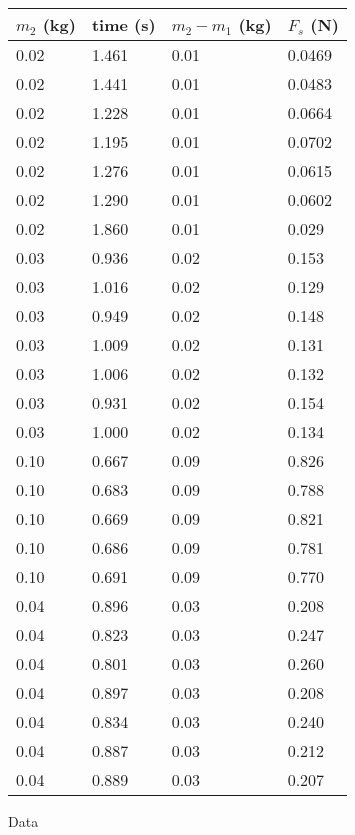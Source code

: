 \documentclass{article}
\begin{document}
\begin{figure}[ht]
    \centering
    \begin{tabular}{l|l|l|l}
        \toprule
        $m_2$ (\si{\kilogram}) & time (\si{\second}) & $m_2 - m_1$ (\si{\kilogram}) & $F_s$ (\si{\newton}) \\
        \midrule
        0.02 & 1.461 & 0.01 & 0.0469 \\
        0.02 & 1.441 & 0.01 & 0.0483 \\
        0.02 & 1.228 & 0.01 & 0.0664 \\
        0.02 & 1.195 & 0.01 & 0.0702 \\
        0.02 & 1.276 & 0.01 & 0.0615 \\
        0.02 & 1.290 & 0.01 & 0.0602 \\
        0.02 & 1.860 & 0.01 & 0.029 \\
        0.03 & 0.936 & 0.02 & 0.153 \\
        0.03 & 1.016 & 0.02 & 0.129 \\
        0.03 & 0.949 & 0.02 & 0.148 \\
        0.03 & 1.009 & 0.02 & 0.131 \\
        0.03 & 1.006 & 0.02 & 0.132 \\
        0.03 & 0.931 & 0.02 & 0.154 \\
        0.03 & 1.000 & 0.02 & 0.134 \\
        0.10 & 0.667 & 0.09 & 0.826 \\
        0.10 & 0.683 & 0.09 & 0.788 \\
        0.10 & 0.669 & 0.09 & 0.821 \\
        0.10 & 0.686 & 0.09 & 0.781 \\
        0.10 & 0.691 & 0.09 & 0.770 \\
        0.04 & 0.896 & 0.03 & 0.208 \\
        0.04 & 0.823 & 0.03 & 0.247 \\
        0.04 & 0.801 & 0.03 & 0.260 \\
        0.04 & 0.897 & 0.03 & 0.208 \\
        0.04 & 0.834 & 0.03 & 0.240 \\
        0.04 & 0.887 & 0.03 & 0.212 \\
        0.04 & 0.889 & 0.03 & 0.207 \\
    \end{tabular}
    \caption{Data}
    \label{fig:data}
\end{figure}
\end{document}
